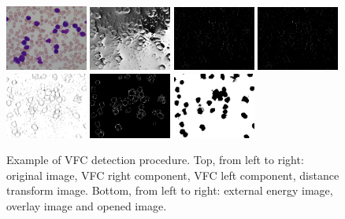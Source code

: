 {	\begin{figure}[h]
		\centering
		\hspace{-1.5mm}\includegraphics[width=0.24\textwidth]{images/2018_1_visapp/015_1}\vspace{1 mm}
		\includegraphics[width=0.24\textwidth]{images/2018_1_visapp/figure2}
		\includegraphics[width=0.24\textwidth]{images/2018_1_visapp/figure3}
		\includegraphics[width=0.24\textwidth]{images/2018_1_visapp/figure3}
		\includegraphics[width=0.24\textwidth]{images/2018_1_visapp/figure4}
		\includegraphics[width=0.24\textwidth]{images/2018_1_visapp/figure5}
		\includegraphics[width=0.24\textwidth]{images/2018_1_visapp/figure7}
		\caption[VFC detection.]{\label{fig:vfc1}Example of VFC detection procedure. Top, from left to right: original image, VFC right component, VFC left component, distance transform image. Bottom, from left to right: external energy image, overlay image and opened image.}
	\end{figure}
	
}
